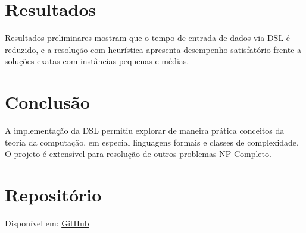 \documentclass[conference]{IEEEtran}
\begin{document}
\section{Resultados}
Resultados preliminares mostram que o tempo de entrada de dados via DSL é reduzido, e a resolução com heurística apresenta desempenho satisfatório frente a soluções exatas com instâncias pequenas e médias.

\section{Conclusão}
A implementação da DSL permitiu explorar de maneira prática conceitos da teoria da computação, em especial linguagens formais e classes de complexidade. O projeto é extensível para resolução de outros problemas NP-Completo.

\section*{Repositório}
Disponível em: \href{https://github.com/Guilherme-del/uniararas/tree/master/python/teoriaCompiladores/n2}{GitHub}



\end{document}
